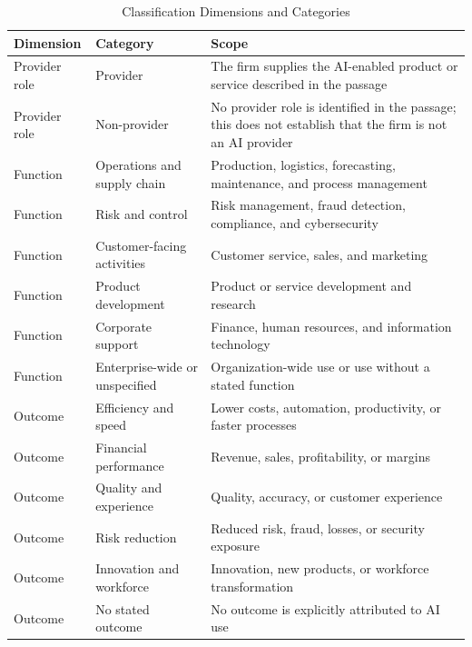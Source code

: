 \documentclass[12pt]{article}
\begin{document}
\begin{table}[htbp]
\centering
\caption{Classification Dimensions and Categories}
\label{tab:classification_categories}
\small
\begin{tabularx}{\textwidth}{@{}p{}p{}X@{}}
\toprule
Dimension & Category & Scope \\
\midrule
Provider role & Provider &
The firm supplies the AI-enabled product or service described in the passage \\
\addlinespace
Provider role & Non-provider &
No provider role is identified in the passage; this does not establish that the firm is not an AI provider \\
\midrule
Function & Operations and supply chain &
Production, logistics, forecasting, maintenance, and process management \\
\addlinespace
Function & Risk and control &
Risk management, fraud detection, compliance, and cybersecurity \\
\addlinespace
Function & Customer-facing activities &
Customer service, sales, and marketing \\
\addlinespace
Function & Product development &
Product or service development and research \\
\addlinespace
Function & Corporate support &
Finance, human resources, and information technology \\
\addlinespace
Function & Enterprise-wide or unspecified &
Organization-wide use or use without a stated function \\
\midrule
Outcome & Efficiency and speed &
Lower costs, automation, productivity, or faster processes \\
\addlinespace
Outcome & Financial performance &
Revenue, sales, profitability, or margins \\
\addlinespace
Outcome & Quality and experience &
Quality, accuracy, or customer experience \\
\addlinespace
Outcome & Risk reduction &
Reduced risk, fraud, losses, or security exposure \\
\addlinespace
Outcome & Innovation and workforce &
Innovation, new products, or workforce transformation \\
\addlinespace
Outcome & No stated outcome &
No outcome is explicitly attributed to AI use \\
\bottomrule
\end{tabularx}
\end{table}
\end{document}
